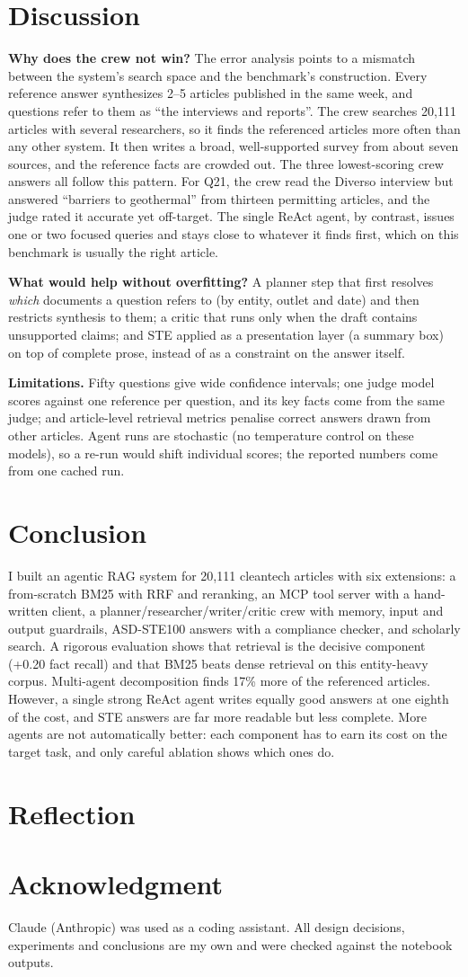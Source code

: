 \section{Discussion}
\textbf{Why does the crew not win?} The error analysis points to a mismatch between the system's search space and
the benchmark's construction. Every reference answer synthesizes 2--5 articles published in the same week, and
questions refer to them as ``the interviews and reports''. The crew searches 20{,}111 articles with several
researchers, so it finds the referenced articles more often than any other system. It then writes a broad,
well-supported survey from about seven sources, and the reference facts are crowded out. The three lowest-scoring
crew answers all follow this pattern. For Q21, the crew read the Diverso interview but answered ``barriers to
geothermal'' from thirteen permitting articles, and the judge rated it accurate yet off-target. The single ReAct
agent, by contrast, issues one or two focused queries and stays close to whatever it finds first, which on this
benchmark is usually the right article.

\textbf{What would help without overfitting?} A planner step that first resolves \emph{which} documents a question
refers to (by entity, outlet and date) and then restricts synthesis to them; a critic that runs only when the
draft contains unsupported claims; and STE applied as a presentation layer (a summary box) on top of complete
prose, instead of as a constraint on the answer itself.

\textbf{Limitations.} Fifty questions give wide confidence intervals; one judge model scores against one reference
per question, and its key facts come from the same judge; and article-level retrieval metrics penalise correct
answers drawn from other articles. Agent runs are stochastic (no temperature control on these models), so a
re-run would shift individual scores; the reported numbers come from one cached run.

\section{Conclusion}
I built an agentic RAG system for 20{,}111 cleantech articles with six extensions: a from-scratch BM25 with RRF and
reranking, an MCP tool server with a hand-written client, a planner/researcher/writer/critic crew with memory,
input and output guardrails, ASD-STE100 answers with a compliance checker, and scholarly search. A rigorous
evaluation shows that retrieval is the decisive component (+0.20 fact recall) and that BM25 beats dense
retrieval on this entity-heavy corpus. Multi-agent decomposition finds 17\% more of the referenced articles.
However, a single strong ReAct agent writes equally good answers at one eighth of the cost, and STE answers are far
more readable but less complete. More agents are not automatically better: each component has to earn its cost on
the target task, and only careful ablation shows which ones do.

\section{Reflection}

\section*{Acknowledgment}
Claude (Anthropic) was used as a coding assistant. All design decisions, experiments and conclusions are my own and
were checked against the notebook outputs.
